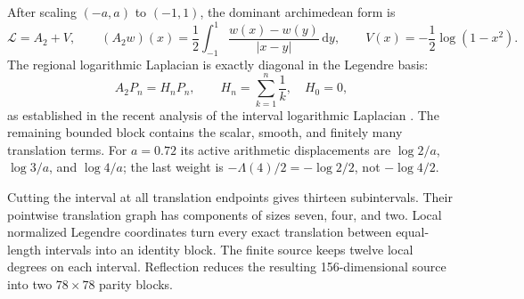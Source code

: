 \documentclass[10pt]{article}
\newcommand{\dd}{\,\mathrm d}
\begin{document}
After scaling $(-a,a)$ to $(-1,1)$, the dominant archimedean form is
\begin{equation}\label{eq:L}
 \mathcal L=A_2+V,\qquad
 (A_2w)(x)=\frac12\int_{-1}^1
 \frac{w(x)-w(y)}{|x-y|}\dd y,\qquad
 V(x)=-\frac12\log(1-x^2).
\end{equation}
The regional logarithmic Laplacian is exactly diagonal in the Legendre basis:
\begin{equation}\label{eq:harmonic}
 A_2P_n=H_nP_n,\qquad H_n=\sum_{k=1}^n\frac1k,\quad H_0=0,
\end{equation}
as established in the recent analysis of the interval logarithmic Laplacian
\cite{RosenzweigStanfill2026}.  The remaining bounded block contains the
scalar, smooth, and finitely many translation terms.  For $a=0.72$ its active
arithmetic displacements are $\log2/a$, $\log3/a$, and $\log4/a$; the last
weight is $-\Lambda(4)/2=-\log2/2$, not $-\log4/2$.

Cutting the interval at all translation endpoints gives thirteen subintervals.
Their pointwise translation graph has components of sizes seven, four, and
two.  Local normalized Legendre coordinates turn every exact translation
between equal-length intervals into an identity block.  The finite source
keeps twelve local degrees on each interval.  Reflection reduces the resulting
156-dimensional source into two $78\times78$ parity blocks.
\end{document}
